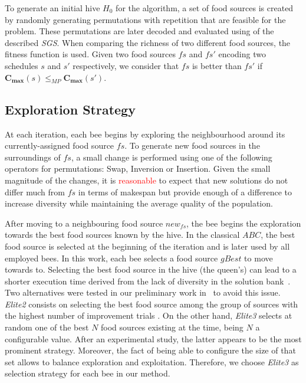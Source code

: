 \documentclass[sn-mathphys]{sn-jnl}%
\theoremstyle{thmstyleone}%
\theoremstyle{thmstyletwo}%
\theoremstyle{thmstylethree}%
\newcommand{\review}[1]{\textcolor{red}{#1}} %
\begin{document}
To generate an initial hive $H_0$ for the algorithm, a set of food sources is created by randomly generating permutations with repetition that are feasible for the problem. These permutations are later decoded and evaluated using of the described \emph{SGS}. When comparing the richness of two different food sources, the fitness function is used. Given two food sources $fs$ and $fs'$ encoding two schedules $s$ and $s'$ respectively, we consider that $fs$ is better than $fs'$ if $\mathbf{C_{max}}(s) \leq_{MP} \mathbf{C_{max}}(s')$.


\subsection{Exploration Strategy}\label{subsec:Exploration}
At each iteration, each bee begins by exploring the neighbourhood around its currently-assigned food source $fs$. To generate new food sources in the surroundings of $fs$, a small change is performed using one of the following operators for permutations: Swap, Inversion or Insertion. Given the small magnitude of the changes, it is \review{reasonable} to expect that new solutions do not differ much from $fs$ in terms of makespan but provide enough of a difference to increase diversity while maintaining the average quality of the population.

After moving to a neighbouring food source $new_{fs}$, the bee begins the exploration towards the best food sources known by the hive. In the classical $ABC$, the best food source is selected at the beginning of the iteration and is later used by all employed bees. In this work, each bee selects a food source $gBest$ to move towards to. Selecting the best food source in the hive (the queen's) can lead to a shorter execution time derived from the lack of diversity in the solution bank~\cite{Banharnsakun2012}. Two alternatives were tested in our preliminary work in~\cite{Diaz2022} to avoid this issue. \emph{Elite2} consists on selecting the best food source among the group of sources with the highest number of improvement trials \cite{Garcia-Alvarez2018}. On the other hand, \emph{Elite3} selects at random one of the best $N$ food sources existing at the time, being $N$ a configurable value. After an experimental study, the latter appears to be the most prominent strategy. Moreover, the fact of being able to configure the size of that set allows to balance exploration and exploitation. Therefore, we choose \emph{Elite3} as selection strategy for each bee in our method.
\end{document}
